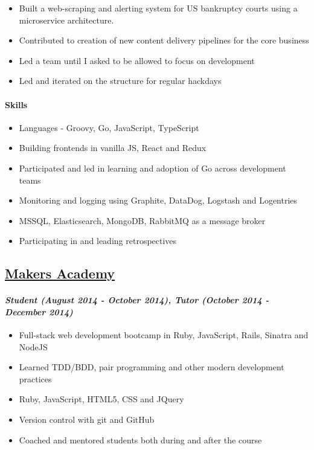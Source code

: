 \begin{itemize}
\tightlist
\item
  Built a web-scraping and alerting system for US bankruptcy courts
  using a microservice architecture.
\item
  Contributed to creation of new content delivery pipelines for the core
  business
\item
  Led a team until I asked to be allowed to focus on development
\item
  Led and iterated on the structure for regular hackdays
\end{itemize}

\paragraph{Skills}\label{skills-1}

\begin{itemize}
\tightlist
\item
  Languages - Groovy, Go, JavaScript, TypeScript
\item
  Building frontends in vanilla JS, React and Redux
\item
  Participated and led in learning and adoption of Go across development
  teams
\item
  Monitoring and logging using Graphite, DataDog, Logstash and
  Logentries
\item
  MSSQL, Elasticsearch, MongoDB, RabbitMQ as a message broker
\item
  Participating in and leading retrospectives
\end{itemize}

\subsection{\texorpdfstring{\href{http://www.makersacademy.com/}{Makers
Academy}}{Makers Academy}}\label{makers-academy}

\paragraph{\texorpdfstring{\emph{Student (August 2014 - October 2014),
Tutor (October 2014 - December
2014)}}{Student (August 2014 - October 2014), Tutor (October 2014 - December 2014)}}\label{student-august-2014---october-2014-tutor-october-2014---december-2014}

\begin{itemize}
\tightlist
\item
  Full-stack web development bootcamp in Ruby, JavaScript, Rails,
  Sinatra and NodeJS
\item
  Learned TDD/BDD, pair programming and other modern development
  practices
\item
  Ruby, JavaScript, HTML5, CSS and JQuery
\item
  Version control with git and GitHub
\item
  Coached and mentored students both during and after the course
\end{itemize}

